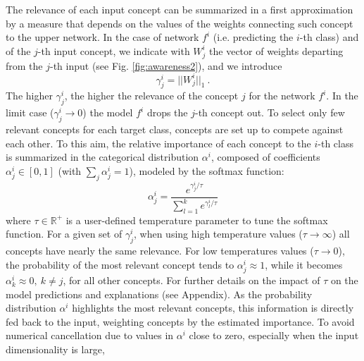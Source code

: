 \documentclass[withindex,glossary]{cam-thesis}
\theoremstyle{plain}
\theoremstyle{definition}
\theoremstyle{remark}
\begin{document}
The relevance of each input concept can be summarized in a first approximation by a measure that depends on the values of the weights connecting such concept to the upper network. In the case of network $f^i$ (i.e. predicting the $i$-th class) and of the $j$-th input concept, we indicate with $W_j^i$ the vector of weights departing from the $j$-th input (see Fig. \ref{fig:awareness2}), and we introduce
\begin{equation} \label{eq:gamma}
    \gamma^i_j = ||W^i_j||_1\ .
\end{equation}
The higher $\gamma^i_j$, the higher the relevance of the concept $j$ for the network $f^i$. In the limit case ($\gamma_j^i \rightarrow 0$) the model $f^i$ drops the $j$-th concept out.
To select only few relevant concepts for each target class, concepts are set up to compete against each other. To this aim, the relative importance of each concept to the $i$-th class is summarized in the categorical distribution 
$\alpha^{i}$, composed of coefficients
$\alpha^i_j \in [0,1]$ (with $\sum_j \alpha_j^i = 1$), modeled by the softmax function:
\begin{equation} \label{eq:alpha}
    \alpha^i_j = \frac{e^{\gamma^i_j/\tau}}{\sum_{l=1}^k e^{\gamma^i_l/\tau}}
\end{equation}
where $\tau \in \mathbb{R}^+$ is a user-defined temperature parameter to tune
the softmax function. For a given set of $\gamma^i_j$, when using high temperature values ($\tau \rightarrow \infty$) all concepts have nearly the same relevance. For low temperatures values ($\tau \rightarrow 0$), the probability of the most relevant concept tends to $\alpha_j^i\approx 1$, while it becomes $\alpha_k^i\approx 0, \ k \neq j$, for all other concepts. For further details on the impact of $\tau$ on the model predictions and explanations (see Appendix).
As the probability distribution $\alpha^i$ highlights the most relevant concepts, this information is directly fed back to the input, weighting concepts by the estimated importance. To avoid numerical cancellation due to values in $\alpha^i$ close to zero, especially when the input dimensionality is large,
\end{document}
